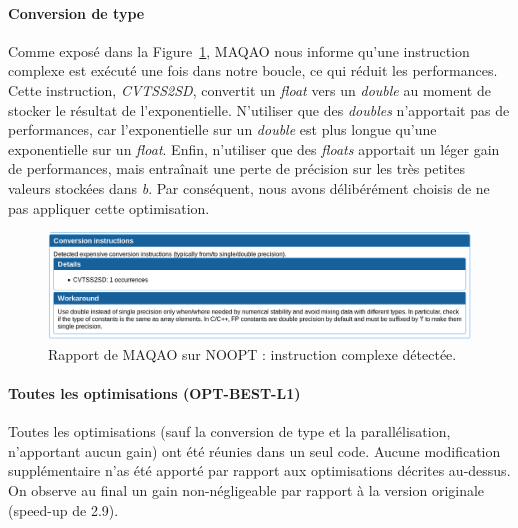 \documentclass[12pt,a4paper]{article}
\begin{document}
\paragraph{Conversion de type} Comme exposé dans la
Figure~\ref{fig.maqao_noopt_complex_instr}, MAQAO nous informe qu'une
instruction complexe est exécuté une fois dans notre boucle, ce qui réduit les
performances. Cette instruction, \textit{CVTSS2SD}, convertit un \textit{float}
vers un \textit{double} au moment de stocker le résultat de l'exponentielle.
N'utiliser que des \textit{doubles} n'apportait pas de performances, car
l'exponentielle sur un \textit{double} est plus longue qu'une exponentielle sur
un \textit{float}. Enfin, n'utiliser que des \textit{floats} apportait un léger
gain de performances, mais entraînait une perte de précision sur les très
petites valeurs stockées dans \textit{b}. Par conséquent, nous avons délibérément
choisis de ne pas appliquer cette optimisation.

\begin{figure}[h]
    \centering
    \includegraphics[scale=0.4]{./figures/L1/maqao_noopt_complex_instr.png}
    \caption{Rapport de MAQAO sur NOOPT : instruction complexe détectée.}
    \label{fig.maqao_noopt_complex_instr}
\end{figure}

\paragraph{Toutes les optimisations (OPT-BEST-L1)} Toutes les optimisations
(sauf la conversion de type et la parallélisation, n'apportant aucun gain) ont
été réunies dans un seul code. Aucune modification supplémentaire n'as été
apporté par rapport aux optimisations décrites au-dessus. On observe au final
un gain non-négligeable par rapport à la version originale (speed-up de 2.9).
\end{document}
